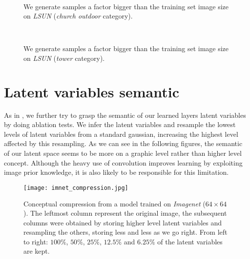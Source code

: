 \documentclass{article}
\begin{document}
\begin{figure}[H]
\vspace{0pt}
    \centering {} \\
    \caption{We generate samples a factor bigger than the training set image size on \emph{LSUN} (\emph{church outdoor} category).}
\vspace{0pt}
\end{figure}

\begin{figure}[H]
\vspace{0pt}
    \centering {} \\
    \caption{We generate samples a factor bigger than the training set image size on \emph{LSUN} (\emph{tower} category).}
\vspace{0pt}
\end{figure}

\section{Latent variables semantic}
\label{app:latent}
As in \citep{gregor2016towards}, we further try to grasp the semantic of our learned layers latent variables by doing ablation tests. We infer the latent variables and resample the lowest levels of latent variables from a standard gaussian, increasing the highest level affected by this resampling. As we can see in the following figures, the semantic of our latent space seems to be more on a graphic level rather than higher level concept. Although the heavy use of convolution improves learning by exploiting image prior knowledge, it is also likely to be responsible for this limitation.


\begin{figure}[H]
    \centering \texttt{[image: imnet\_compression.jpg]}
    \caption{Conceptual compression from a model trained on \emph{Imagenet} ($64 \times 64$). The leftmost column represent the original image, the subsequent columns were obtained by storing higher level latent variables and resampling the others, storing less and less as we go right. From left to right: $100\%$, $50\%$, $25\%$, $12.5\%$ and $6.25\%$ of the latent variables are kept.}
\end{figure}
\end{document}
